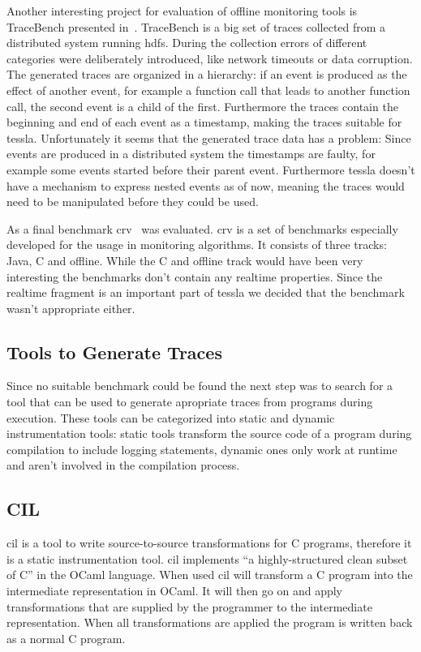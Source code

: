 Another interesting project for evaluation of offline monitoring tools is TraceBench presented in~\cite{Zhou2014}.
TraceBench is a big set of traces collected from a distributed system running \gls{hdfs}.
During the collection errors of different categories were deliberately introduced, like network timeouts or data corruption.
The generated traces are organized in a hierarchy: if an event is produced as the effect of another event, for example a function call that leads to another function call, the second event is a child of the first.
Furthermore the traces contain the beginning and end of each event as a timestamp, making the traces suitable for \gls{tessla}.
Unfortunately it seems that the generated trace data has a problem: Since events are produced in a distributed system the timestamps are faulty, for example some events started before their parent event.
Furthermore \gls{tessla} doesn't have a mechanism to express nested events as of now, meaning the traces would need to be manipulated before they could be used.

As a final benchmark \gls{crv}~\citep{Reger2016} was evaluated.
\Gls{crv} is a set of benchmarks especially developed for the usage in monitoring algorithms.
It consists of three tracks: Java, C and offline.
While the C and offline track would have been very interesting the benchmarks don't contain any realtime properties.
Since the realtime fragment is an important part of \gls{tessla} we decided that the benchmark wasn't appropriate either.

\subsection{Tools to Generate Traces}

Since no suitable benchmark could be found the next step was to search for a tool that can be used to generate apropriate traces from programs during execution.
These tools can be categorized into static and dynamic instrumentation tools: static tools transform the source code of a program during compilation to include logging statements, dynamic ones only work at runtime and aren't involved in the compilation process.

\subsection{CIL}

\Gls{cil} \cite{Necula2002} is a tool to write source-to-source transformations for C programs, therefore it is a static instrumentation tool.
\Gls{cil} implements ``a highly-structured clean subset of C'' in the OCaml language.
When used \gls{cil} will transform a C program into the intermediate representation in OCaml.
It will then go on and apply transformations that are supplied by the programmer to the intermediate representation.
When all transformations are applied the program is written back as a normal C program.

